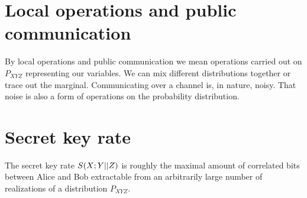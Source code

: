 \section{Local operations and public communication}
    By local operations and public communication we mean operations carried out on $P_{XYZ}$ representing our variables.
    We can mix different distributions together or trace out the marginal.
    Communicating over a channel is, in nature, noisy. 
    That noise is also a form of operations on the probability distribution.
    
\section{Secret key rate} \label{seckeyrate}
    The secret key rate $S(X;Y||Z)$ is roughly the maximal amount of correlated bits between Alice and Bob extractable from an arbitrarily large number of realizations of a distribution $P_{XYZ}$.
